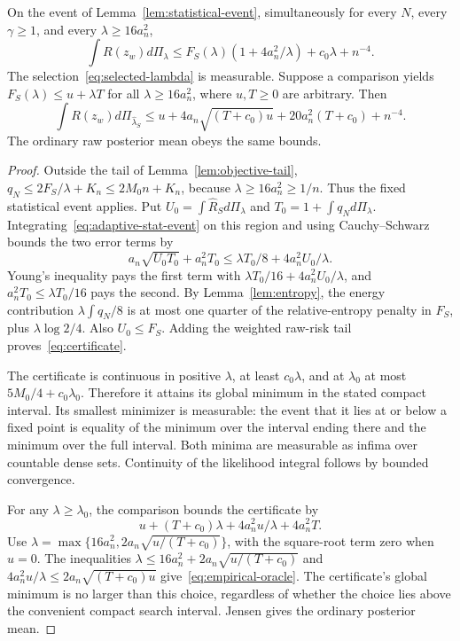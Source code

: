 \begin{theorem}
\label{thm:certificate}
On the event of Lemma~\ref{lem:statistical-event}, simultaneously for every $N$, every $\gamma\ge1$, and every $\lambda\ge16a_n^2$,
\begin{equation}
 \int R(z_w)d\Pi_\lambda\le
 F_S(\lambda)(1+4a_n^2/\lambda)+c_0\lambda+n^{-4}.
 \label{eq:certificate}
\end{equation}
The selection~\eqref{eq:selected-lambda} is measurable. Suppose a comparison yields
$F_S(\lambda)\le u+\lambda T$ for all $\lambda\ge16a_n^2$, where $u,T\ge0$ are arbitrary. Then
\begin{equation}
 \int R(z_w)d\Pi_{\widehat\lambda_S}
 \le u+4a_n\sqrt{(T+c_0)u}+20a_n^2(T+c_0)+n^{-4}.
 \label{eq:empirical-oracle}
\end{equation}
The ordinary raw posterior mean obeys the same bounds.
\end{theorem}
\begin{proof}
Outside the tail of Lemma~\ref{lem:objective-tail},
$q_N\le2F_S/\lambda+K_n\le2M_0n+K_n$, because $\lambda\ge16a_n^2\ge1/n$. Thus the fixed statistical event applies. Put $U_0=\int\widehat R_Sd\Pi_\lambda$ and $T_0=1+\int q_Nd\Pi_\lambda$. Integrating~\eqref{eq:adaptive-stat-event} on this region and using Cauchy--Schwarz bounds the two error terms by
\[
 a_n\sqrt{U_0T_0}+a_n^2T_0
 \le\lambda T_0/8+4a_n^2U_0/\lambda.
\]
Young's inequality pays the first term with $\lambda T_0/16+4a_n^2U_0/\lambda$, and $a_n^2T_0\le\lambda T_0/16$ pays the second.
By Lemma~\ref{lem:entropy}, the energy contribution $\lambda\int q_N/8$ is at most one quarter of the relative-entropy penalty in $F_S$, plus $\lambda\log2/4$. Also $U_0\le F_S$. Adding the weighted raw-risk tail proves~\eqref{eq:certificate}.

The certificate is continuous in positive $\lambda$, at least $c_0\lambda$, and at $\lambda_0$ at most $5M_0/4+c_0\lambda_0$. Therefore it attains its global minimum in the stated compact interval. Its smallest minimizer is measurable: the event that it lies at or below a fixed point is equality of the minimum over the interval ending there and the minimum over the full interval. Both minima are measurable as infima over countable dense sets. Continuity of the likelihood integral follows by bounded convergence.

For any $\lambda\ge\lambda_0$, the comparison bounds the certificate by
\[
 u+(T+c_0)\lambda+4a_n^2u/\lambda+4a_n^2T.
\]
Use $\lambda=\max\{16a_n^2,2a_n\sqrt{u/(T+c_0)}\}$, with the square-root term zero when $u=0$. The inequalities
$\lambda\le16a_n^2+2a_n\sqrt{u/(T+c_0)}$ and
$4a_n^2u/\lambda\le2a_n\sqrt{(T+c_0)u}$ give~\eqref{eq:empirical-oracle}. The certificate's global minimum is no larger than this choice, regardless of whether the choice lies above the convenient compact search interval. Jensen gives the ordinary posterior mean.
\end{proof}

